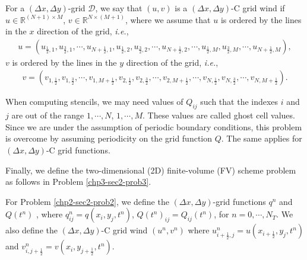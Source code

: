 \begin{definition}
	\label{chp2-rmk-2d-gridfunction2}
	For a $(\Delta x,\Delta y)$-grid $\mathcal{D}$, we say that $(u,v)$ is a $(\Delta x,\Delta y)$-C grid wind if 
	$u \in \mathbb{R}^{(N+1) \times M}$, $v \in \mathbb{R}^{N \times (M+1)}$, where we assume that $u$ is ordered by
	the lines in the $x$ direction of the grid, \textit{i.e.},
	\begin{align*}
	u = (u_{\frac{1}{2},1}, u_{\frac{3}{2},1}, \cdots, u_{N+\frac{1}{2},1}, u_{\frac{1}{2},2}, u_{\frac{3}{2},2}, \cdots, u_{N+\frac{1}{2},2}, \cdots ,
	u_{\frac{1}{2},M}, u_{\frac{3}{2},M}, \cdots, u_{N+\frac{1}{2},M}),
	\end{align*}
	$v$ is ordered by the lines in the $y$ direction of the grid, \textit{i.e.},
	\begin{align*}
	v = (v_{1,\frac{1}{2}}, v_{1,\frac{3}{2}}, \cdots, v_{1,M+\frac{1}{2}}, v_{2,\frac{1}{2}}, v_{2,\frac{3}{2}}, \cdots, v_{2,M+\frac{1}{2}}, \cdots ,
	v_{N,\frac{1}{2}}, v_{N,\frac{3}{2}}, \cdots, v_{N,M+\frac{1}{2}}).
\end{align*}
\end{definition}
\begin{remark}
	When computing stencils, we may need values of $Q_{ij}$ such that the
	indexes $i$ and $j$ are out of the range $1,\cdots, N$, $1,\cdots, M$.
	These values are called ghost cell values.
	Since we are under the assumption of periodic boundary conditions, this problem
	is overcome by assuming periodicity on the grid function $Q$. 
	The same applies for $(\Delta x,\Delta y)$-C grid functions.
\end{remark}
Finally, we define the two-dimensional (2D) finite-volume (FV)
scheme problem as follows in Problem \ref{chp3-sec2-prob3}.
\begin{remark}
	For Problem \ref{chp2-sec2-prob2}, we define the $(\Delta x,\Delta y)$-grid functions
	$q^n$ and $Q(t^n)$ , where ${q}^n_{ij} = {q}(x_i, y_j, t^{n})$, $Q(t^n)_{ij} = Q_{ij}(t^n)$, for $n=0, \cdots, N_T$.
	We also define the $(\Delta x,\Delta y)$-C grid wind $(u^n,v^n)$ where $u_{i+\frac{1}{2},j}^n = u(x_{i+\frac{1}{2}},y_j,t^{n})$ and
	$v_{i,j+\frac{1}{2}}^n = v(x_i,y_{j+\frac{1}{2}},t^{n})$.
\end{remark}
